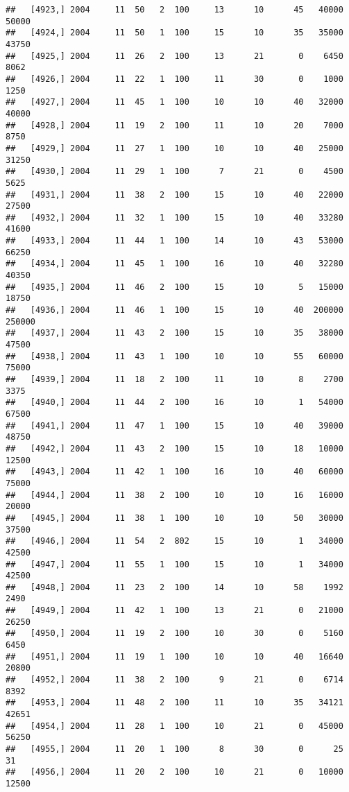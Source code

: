 \documentclass{article}\usepackage[]{graphicx}\usepackage[]{color}
\makeatletter
\newenvironment{kframe}{%
 \def\at@end@of@kframe{}%
 \ifinner\ifhmode%
  \def\at@end@of@kframe{\end{minipage}}%
  \begin{minipage}{\columnwidth}%
 \fi\fi%
 \def\FrameCommand##1{\hskip\@totalleftmargin \hskip-\fboxsep
 \colorbox{shadecolor}{##1}\hskip-\fboxsep
     \hskip-\linewidth \hskip-\@totalleftmargin \hskip\columnwidth}%
 \MakeFramed {\advance\hsize-\width
   \@totalleftmargin\z@ \linewidth\hsize
   \@setminipage}}%
 {\par\unskip\endMakeFramed%
 \at@end@of@kframe}
\newenvironment{knitrout}{}{} %
\makeatother
\begin{document}
\begin{knitrout}
\begin{kframe}
\begin{verbatim}
##   [4923,] 2004     11  50   2  100     13      10      45   40000   50000
##   [4924,] 2004     11  50   1  100     15      10      35   35000   43750
##   [4925,] 2004     11  26   2  100     13      21       0    6450    8062
##   [4926,] 2004     11  22   1  100     11      30       0    1000    1250
##   [4927,] 2004     11  45   1  100     10      10      40   32000   40000
##   [4928,] 2004     11  19   2  100     11      10      20    7000    8750
##   [4929,] 2004     11  27   1  100     10      10      40   25000   31250
##   [4930,] 2004     11  29   1  100      7      21       0    4500    5625
##   [4931,] 2004     11  38   2  100     15      10      40   22000   27500
##   [4932,] 2004     11  32   1  100     15      10      40   33280   41600
##   [4933,] 2004     11  44   1  100     14      10      43   53000   66250
##   [4934,] 2004     11  45   1  100     16      10      40   32280   40350
##   [4935,] 2004     11  46   2  100     15      10       5   15000   18750
##   [4936,] 2004     11  46   1  100     15      10      40  200000  250000
##   [4937,] 2004     11  43   2  100     15      10      35   38000   47500
##   [4938,] 2004     11  43   1  100     10      10      55   60000   75000
##   [4939,] 2004     11  18   2  100     11      10       8    2700    3375
##   [4940,] 2004     11  44   2  100     16      10       1   54000   67500
##   [4941,] 2004     11  47   1  100     15      10      40   39000   48750
##   [4942,] 2004     11  43   2  100     15      10      18   10000   12500
##   [4943,] 2004     11  42   1  100     16      10      40   60000   75000
##   [4944,] 2004     11  38   2  100     10      10      16   16000   20000
##   [4945,] 2004     11  38   1  100     10      10      50   30000   37500
##   [4946,] 2004     11  54   2  802     15      10       1   34000   42500
##   [4947,] 2004     11  55   1  100     15      10       1   34000   42500
##   [4948,] 2004     11  23   2  100     14      10      58    1992    2490
##   [4949,] 2004     11  42   1  100     13      21       0   21000   26250
##   [4950,] 2004     11  19   2  100     10      30       0    5160    6450
##   [4951,] 2004     11  19   1  100     10      10      40   16640   20800
##   [4952,] 2004     11  38   2  100      9      21       0    6714    8392
##   [4953,] 2004     11  48   2  100     11      10      35   34121   42651
##   [4954,] 2004     11  28   1  100     10      21       0   45000   56250
##   [4955,] 2004     11  20   1  100      8      30       0      25      31
##   [4956,] 2004     11  20   2  100     10      21       0   10000   12500

\end{verbatim}
\end{kframe}
\end{knitrout}
\end{document}
